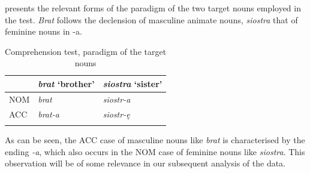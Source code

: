 \begin{table}
    \caption{Comprehension test, example of target sentences with the verb \textit{woła}}
    \label{tab:02:14}
\end{table}

 presents the relevant forms of the paradigm of the two target nouns employed in the test. \textit{Brat} follows the declension of masculine animate nouns, \textit{siostra} that of feminine nouns in -a.

\begin{table}
    \begin{tabularx}{\textwidth}{XXl}
    \lsptoprule
           & \textit{brat} ‘brother’ & \textit{siostra} ‘sister’\\
    \midrule
        NOM & \textit{brat} & \textit{siostr-a}\\
        ACC & \textit{brat-a} & \textit{siostr-ę}\\
    \lspbottomrule
    \end{tabularx}
    \caption{Comprehension test, paradigm of the target nouns}
    \label{tab:02:15}
\end{table}

As can be seen, the ACC case of masculine nouns like \textit{brat} is characterised by the ending \textit{{}-a}, which also occurs in the NOM case of feminine nouns like \textit{siostra}. This observation will be of some relevance in our subsequent analysis of the data.

